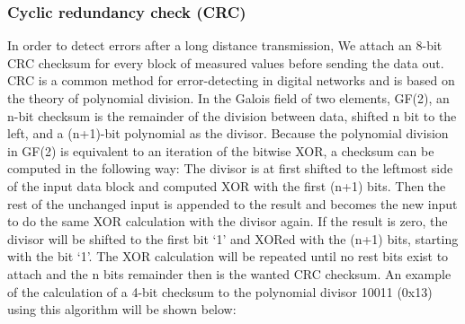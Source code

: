 \documentclass[a4paper]{scrreprt}
\begin{document}
\subsubsection{Cyclic redundancy check (CRC)}\label{chap:crc}
In order to detect errors after a long distance transmission, 
We attach an 8-bit CRC checksum for every block of measured values before sending the data out. \\
CRC is a common method for error-detecting in digital networks and is based on the theory of polynomial division. 
In the Galois field of two elements, GF(2),
an n-bit checksum is the remainder of the division between data, shifted n bit to the left, and a (n+1)-bit polynomial as the divisor.
Because the polynomial division in GF(2) is equivalent to an iteration of the bitwise XOR, a checksum can be computed in the following way:
The divisor is at first shifted to the leftmost side of the input data block and computed XOR with the first (n+1) bits.
Then the rest of the unchanged input is appended to the result and becomes the new input to do the same XOR calculation with the divisor again.
If the result is zero, the divisor will be shifted to the first bit `1' and XORed with the (n+1) bits, starting with the bit `1'. 
The XOR calculation will be repeated until no rest bits exist to attach and the n bits remainder then is the wanted CRC checksum.
An example of the calculation of a 4-bit checksum to the polynomial divisor 10011 (0x13) using this algorithm will be shown below:
\end{document}
